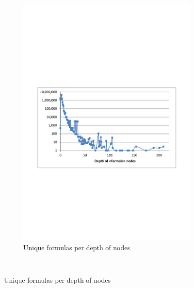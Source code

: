 \documentclass[times]{smrauth}
\begin{document}
\begin{figure}
\begin{subfigure}[b]{0.49\textwidth}
		\includegraphics[width=1\textwidth]{img/depths2}
		\caption{Unique formulas per depth of  nodes}
		\label{fig:depthFormula}
	\end{subfigure}
	~
	

\end{figure}
\end{document}
